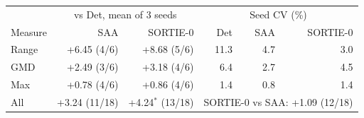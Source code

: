 \begin{tabular}{lrrrrr}\toprule
 & \multicolumn{2}{c}{vs Det, mean of 3 seeds} & \multicolumn{3}{c}{Seed CV (\%)} \\
Measure & SAA & SORTIE-0 & Det & SAA & SORTIE-0 \\
\midrule
Range & +6.45 (4/6) & +8.68 (5/6) & 11.3 & 4.7 & 3.0 \\
GMD & +2.49 (3/6) & +3.18 (4/6) & 6.4 & 2.7 & 4.5 \\
Max & +0.78 (4/6) & +0.86 (4/6) & 1.4 & 0.8 & 1.4 \\
\midrule
All & +3.24 (11/18) & +4.24$^\ast$ (13/18) & \multicolumn{3}{l}{SORTIE-0 vs SAA: +1.09 (12/18)} \\
\bottomrule
\end{tabular}
